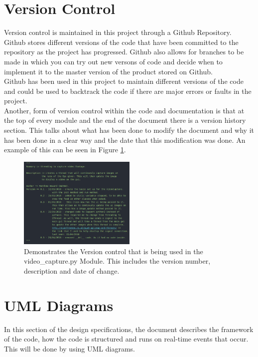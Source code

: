 \documentclass{article}
\begin{document}
    \section{Version Control}
Version control is maintained in this project through a Github Repository. Github stores  different versions of the code that have been committed to the repository as the project has progressed. Github also allows for branches to be made in which you can try out new versons of code and decide when to implement it to the master version of the product stored on Github.\\ \newline
Github has been used in this project to maintain different versions of the code and could be used to backtrack the code if there are major errors or faults in the project.
\\ \newline
Another, form of version control within the code and documentation is that at the top of every module and the end of the document there is a version history section. This talks about what has been done to modify the document and why it has been done in a clear way and the date that this modification was done. An example of this can be seen in Figure \ref{fig:Version_Control}.

\begin{figure}[h]
    \centering
    \includegraphics[width=0.5\textwidth]{version_control.png}
    \caption{Demonstrates the Version control that is being used in the video\_capture.py Module. This includes the version number, description and date of change.}
    \label{fig:Version_Control}
\end{figure}
\clearpage
    \section{UML Diagrams}
In this section of the design specifications, the document describes the framework of the code, how the code is structured and runs on real-time events that occur. This will be done by using UML diagrams. 
\end{document}
